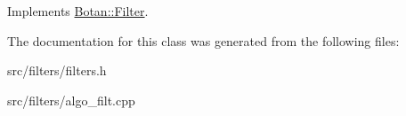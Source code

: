 Implements \hyperlink{classBotan_1_1Filter_ad856ce62d9bdcce8057da99cba606892}{Botan\-::\-Filter}.



The documentation for this class was generated from the following files\-:\begin{DoxyCompactItemize}
\item 
src/filters/filters.\-h\item 
src/filters/algo\-\_\-filt.\-cpp\end{DoxyCompactItemize}
